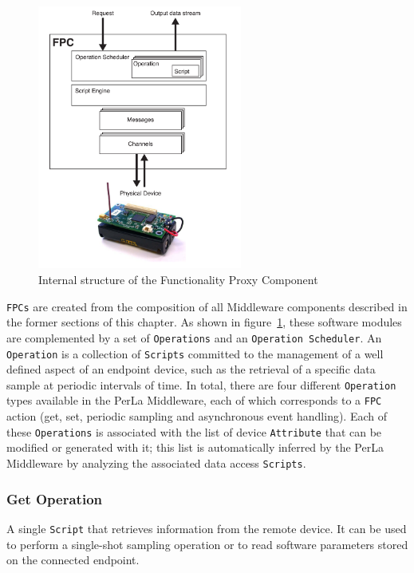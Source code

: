 \begin{figure}[h!]
\center
\includegraphics[width=0.6\textwidth]{imgs/fpc.pdf}
\caption{Internal structure of the Functionality Proxy Component}
\label{fig:fpc}
\end{figure}

\texttt{FPCs} are created from the composition of all Middleware components
described in the former sections of this chapter. As shown in
figure~\ref{fig:fpc}, these software modules are complemented by a set of
\texttt{Operations} and an \texttt{Operation Scheduler}. An \texttt{Operation}
is a collection of \texttt{Scripts} committed to the management of a well
defined aspect of an endpoint device, such as the retrieval of a specific data
sample at periodic intervals of time. In total, there are four different
\texttt{Operation} types available in the PerLa Middleware, each of which
corresponds to a \texttt{FPC} action (get, set, periodic sampling and
asynchronous event handling). Each of these \texttt{Operations} is associated
with the list of device \texttt{Attribute} that can be modified or generated
with it; this list is automatically inferred by the PerLa Middleware by
analyzing the associated data access \texttt{Scripts}.

\subsubsection{Get Operation}

A single \texttt{Script} that retrieves information from the remote device. It
can be used to perform a single-shot sampling operation or to read software
parameters stored on the connected endpoint.

